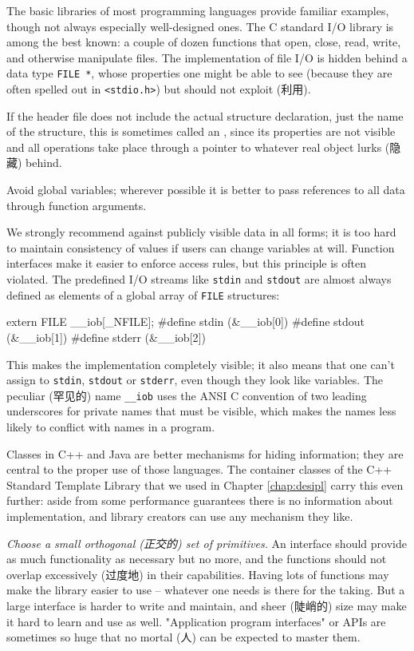 The basic libraries of most programming languages provide familiar
examples, though not always especially well-designed ones. The C standard
I/O library is among the best known: a couple of dozen functions that open,
close, read, write, and otherwise manipulate files. The implementation of
file I/O is hidden behind a data type \verb'FILE *', whose properties one
might be able to see (because they are often spelled out in
\verb'<stdio.h>') but should not exploit (利用).

If the header file does not include the actual structure declaration, just
the name of the structure, this is sometimes called an ,
since its properties are not visible and all operations take place through
a pointer to whatever real object lurks (隐藏) behind.

Avoid global variables; wherever possible it is better to pass references
to all data through function arguments.

We strongly recommend against publicly visible data in all forms; it is too
hard to maintain consistency of values if users can change variables at
will.  Function interfaces make it easier to enforce access rules, but this
principle is often violated. The predefined I/O streams like \verb'stdin'
and \verb'stdout' are almost always defined as elements of a global array
of \verb'FILE' structures:
\begin{wellcode}
    extern  FILE    __iob[_NFILE];
    #define stdin   (&__iob[0])
    #define stdout  (&__iob[1])
    #define stderr  (&__iob[2])
\end{wellcode}

This makes the implementation completely visible; it also means that one
can't assign to \verb'stdin', \verb'stdout' or \verb'stderr', even though
they look like variables.  The peculiar (罕见的) name \verb'__iob' uses the
ANSI C convention of two leading underscores for private names that must be
visible, which makes the names less likely to conflict with names in a
program.

Classes in C++ and Java are better mechanisms for hiding information; they
are central to the proper use of those languages. The container classes of
the C++ Standard Template Library that we used in Chapter \ref{chap:desipl}
carry this even further: aside from some performance guarantees there is no
information about implementation, and library creators can use any
mechanism they like.

\emph{Choose a small orthogonal (正交的) set of primitives.} An interface
should provide as much functionality as necessary but no more, and the
functions should not overlap excessively (过度地) in their capabilities.
Having lots of functions may make the library easier to use -- whatever one
needs is there for the taking. But a large interface is harder to write and
maintain, and sheer (陡峭的) size may make it hard to learn and use as
well. "Application program interfaces" or APIs are sometimes so huge that
no mortal (人) can be expected to master them.

